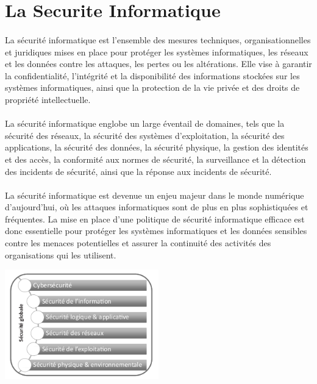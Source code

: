  \section{La Securite Informatique }


\paragraph{ }  La sécurité informatique est l'ensemble des mesures techniques, organisationnelles et juridiques mises en place pour protéger les systèmes informatiques, les réseaux et les données contre les attaques, les pertes ou les altérations. Elle vise à garantir la confidentialité, l'intégrité et la disponibilité des informations stockées sur les systèmes informatiques, ainsi que la protection de la vie privée et des droits de propriété intellectuelle.  

\paragraph{ } La sécurité informatique englobe un large éventail de domaines, tels que la sécurité des réseaux, la sécurité des systèmes d'exploitation, la sécurité des applications, la sécurité des données, la sécurité physique, la gestion des identités et des accès, la conformité aux normes de sécurité, la surveillance et la détection des incidents de sécurité, ainsi que la réponse aux incidents de sécurité.

\paragraph{ }  La sécurité informatique est devenue un enjeu majeur dans le monde numérique d’aujourd’hui, où les attaques informatiques sont de plus en plus sophistiquées et fréquentes. La mise en place d'une politique de sécurité informatique efficace est donc essentielle pour protéger les systèmes informatiques et les données sensibles contre les menaces potentielles et assurer la continuité des activités des organisations qui les utilisent.
\pagebreak

\hbox{\includegraphics[width=0.5\textwidth]{image_sec.png}}
